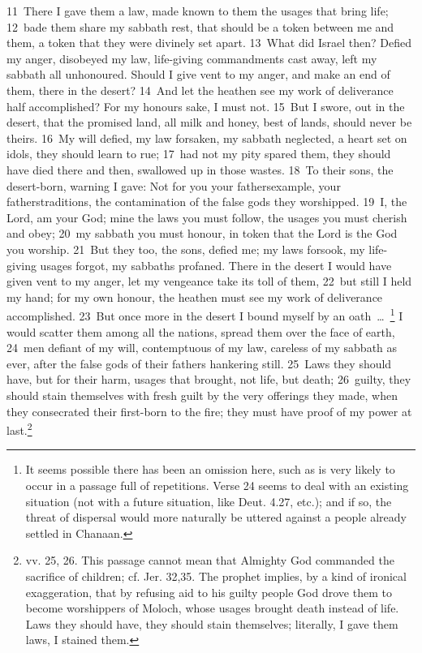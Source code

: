 \documentclass[10pt]{book} %
\begin{document}
\textcolor{benred8}{11}~There I gave them a law, made known to them the usages that bring life; \textcolor{benred8}{12}~bade them share my sabbath rest, that should be a token between me and them, a token that they were divinely set apart. \textcolor{benred8}{13}~What did Israel then? Defied my anger, disobeyed my law, life-giving commandments cast away, left my sabbath all unhonoured. Should I give vent to my anger, and make an end of them, there in the desert? \textcolor{benred8}{14}~And let the heathen see my work of deliverance half accomplished? For my honour\textquotesingle s sake, I must not. \textcolor{benred8}{15}~But I swore, out in the desert, that the promised land, all milk and honey, best of lands, should never be theirs. \textcolor{benred8}{16}~My will defied, my law forsaken, my sabbath neglected, a heart set on idols, they should learn to rue; \textcolor{benred8}{17}~had not my pity spared them, they should have died there and then, swallowed up in those wastes. \textcolor{benred8}{18}~To their sons, the desert-born, warning I gave: Not for you your fathers\textquotesingle  example, your fathers\textquotesingle  traditions, the contamination of the false gods they worshipped. \textcolor{benred8}{19}~I, the Lord, am your God; mine the laws you must follow, the usages you must cherish and obey; \textcolor{benred8}{20}~my sabbath you must honour, in token that the Lord is the God you worship. \textcolor{benred8}{21}~But they too, the sons, defied me; my laws forsook, my life-giving usages forgot, my sabbaths profaned. There in the desert I would have given vent to my anger, let my vengeance take its toll of them, \textcolor{benred8}{22}~but still I held my hand; for my own honour, the heathen must see my work of deliverance accomplished. \textcolor{benred8}{23}~But once more in the desert I bound myself by an oath~\ldots\ \footnote[1]{It seems possible there has been an omission here, such as is very likely to occur in a passage full of repetitions. Verse 24 seems to deal with an existing situation (not with a future situation, like Deut. 4.27, etc.); and if so, the threat of dispersal would more naturally be uttered against a people already settled in Chanaan.} I would scatter them among all the nations, spread them over the face of earth, \textcolor{benred8}{24}~men defiant of my will, contemptuous of my law, careless of my sabbath as ever, after the false gods of their fathers hankering still. \textcolor{benred8}{25}~Laws they should have, but for their harm, usages that brought, not life, but death; \textcolor{benred8}{26}~guilty, they should stain themselves with fresh guilt by the very offerings they made, when they consecrated their first-born to the fire; they must have proof of my power at last.\footnote[2]{vv. 25, 26. This passage cannot mean that Almighty God commanded the sacrifice of children; cf. Jer. 32,35. The prophet implies, by a kind of ironical exaggeration, that by refusing aid to his guilty people God drove them to become worshippers of Moloch, whose usages brought death instead of life. \textasciigrave Laws they should have\textquotesingle , \textasciigrave they should stain themselves\textquotesingle ; literally, \textasciigrave I gave them laws\textquotesingle , \textasciigrave I stained them\textquotesingle .}
\end{document}
